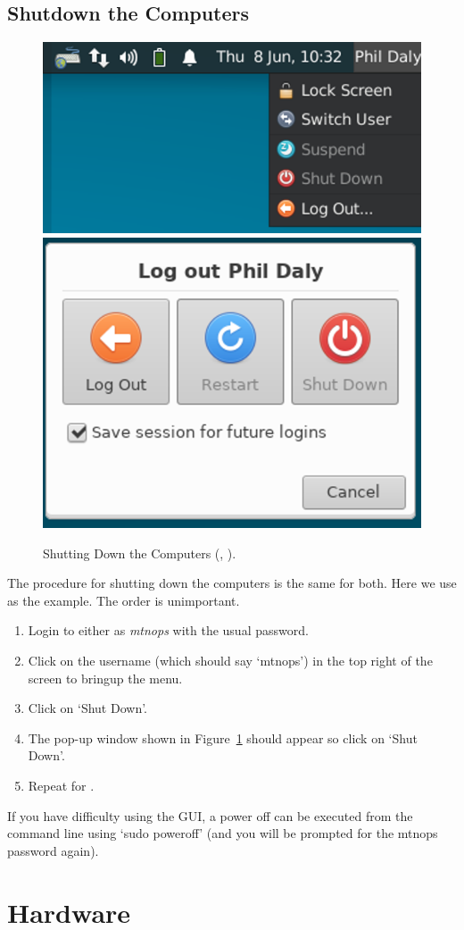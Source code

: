 \documentclass[12pt,twoside]{article}
\begin{document}
\subsection{Shutdown the Computers}
\begin{figure}[!h]
 \centering
 \includegraphics[width=0.45\linewidth]{bonsai1.png}
 \includegraphics[width=0.45\linewidth]{bonsai2.png}
 \caption{Shutting Down the Computers (, ).}
 \label{computershutdown}
\end{figure}

The procedure for shutting down the computers is the same for both. Here we use  as the example.
The order is unimportant.

\begin{enumerate}
\item Login to either  as \emph{mtnops} with the usual password.
\item Click on the username (which should say `mtnops') in the top right of the screen to bringup the menu.
\item Click on `Shut Down'.
\item The pop-up window shown in Figure~\ref{computershutdown} should appear so click on `Shut Down'.
\item Repeat for .
\end{enumerate}

If you have difficulty using the GUI, a power off can be executed from the command line using `sudo poweroff'
(and you will be prompted for the mtnops password again).

\section{Hardware}
\label{Hardware}
\end{document}
